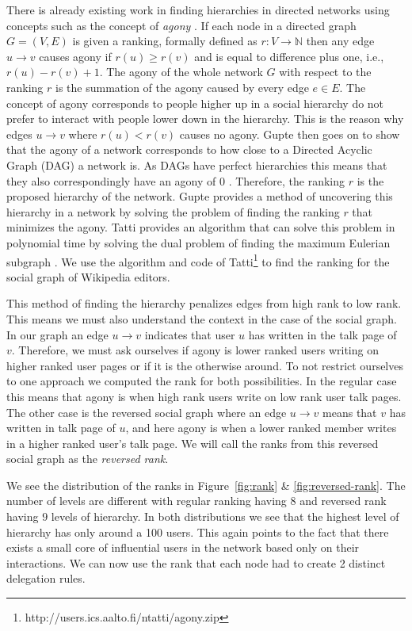 There is already existing work in finding hierarchies in directed networks using concepts such as the concept of \textit{agony} \cite{Tatti2016,gupte2011finding}. If each node in a directed graph $G = (V,E)$ is given a ranking, formally defined as $r:V\rightarrow \mathbb{N}$ then any edge $u\rightarrow v$ causes agony if $r(u)\geq r(v)$ and is equal to difference plus one, i.e., $r(u)-r(v)+1$. The agony of the whole network $G$ with respect to the ranking $r$ is the summation of the agony caused by every edge $e \in E$. The concept of agony corresponds to people higher up in a social hierarchy do not prefer to interact with people lower down in the hierarchy. This is the reason why edges $u\rightarrow v$ where $r(u)<r(v)$ causes no agony. Gupte then goes on to show that the agony of a network corresponds to how close to a Directed Acyclic Graph (DAG) a network is. As DAGs have perfect hierarchies this means that they also correspondingly have an agony of $0$ \cite{gupte2011finding}. Therefore, the ranking $r$ is the proposed hierarchy of the network. Gupte provides a method of uncovering this hierarchy in a network by solving the problem of finding the ranking $r$ that minimizes the agony. Tatti provides an algorithm that can solve this problem in polynomial time by solving the dual problem of finding the maximum Eulerian subgraph \cite{Tatti2016}. We use the algorithm and code of Tatti\footnote{http://users.ics.aalto.fi/ntatti/agony.zip} to find the ranking for the social graph of Wikipedia editors. 

This method of finding the hierarchy penalizes edges from high rank to low rank. This means we must also understand the context in the case of the social graph. In our graph an edge $u \rightarrow v$ indicates that user $u$ has written in the talk page of $v$. Therefore, we must ask ourselves if agony is lower ranked users writing on higher ranked user pages or if it is the otherwise around. To not restrict ourselves to one approach we computed the rank for both possibilities. In the regular case this means that agony is when high rank users write on low rank user talk pages. The other case is the reversed social graph where an edge $u \rightarrow v$ means that $v$ has written in talk page of $u$, and here agony is when a lower ranked member writes in a higher ranked user's talk page. We will call the ranks from this reversed social graph as the \textit{reversed rank}. 

We see the distribution of the ranks in Figure~\ref{fig:rank} \& \ref{fig:reversed-rank}. The number of levels are different with regular ranking having $8$ and reversed rank having $9$ levels of hierarchy. In both distributions we see that the highest level of hierarchy has only around a 100 users. This again points to the fact that there exists a small core of influential users in the network based only on their interactions. We can now use the rank that each node had to create 2 distinct delegation rules.

